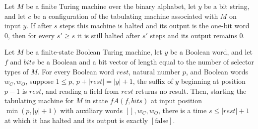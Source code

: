 \begin{theorem}
\label{Complexity.Meyer.reject_persist}
\leanok
{}
Let $M$ be a finite Turing machine over the binary alphabet, let $y$ be a bit string,
and let $c$ be a configuration of the tabulating machine associated with $M$ on input
$y$. If after $s$ steps this machine is halted and its output is the one-bit word $0$,
then for every $s' \ge s$ it is still halted after $s'$ steps and its output remains
$0$.
\end{theorem}

\begin{theorem}
\label{Complexity.Meyer.field_none}
\leanok
{}
Let $M$ be a finite-state Boolean Turing machine, let $y$ be a Boolean word, and let $f$
and $bits$ be a Boolean and a bit vector of length equal to the number of selector types
of $M$. For every Boolean word $rest$, natural number $p$, and Boolean words $w_C,w_O$,
suppose $1\le p$, $p+|rest|=|y|+1$, the suffix of $y$ beginning at position $p-1$ is
$rest$, and reading a field from $rest$ returns no result. Then, starting the tabulating
machine for $M$ in state $fA(f,bits)$ at input position $\min(p,|y|+1)$ with auxiliary
words $[],w_C,w_O$, there is a time $s\le |rest|+1$ at which it has halted and its
output is exactly $[\mathrm{false}]$.
\end{theorem}


